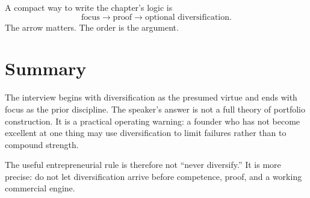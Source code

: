 A compact way to write the chapter's logic is
\begin{equation}
\text{focus}
\longrightarrow
\text{proof}
\longrightarrow
\text{optional diversification}.
\end{equation}
The arrow matters. The order is the argument.

\section{Summary}

The interview begins with diversification as the presumed virtue and ends with focus as the prior discipline. The speaker's answer is not a full theory of portfolio construction. It is a practical operating warning: a founder who has not become excellent at one thing may use diversification to limit failures rather than to compound strength.

The useful entrepreneurial rule is therefore not ``never diversify.'' It is more precise: do not let diversification arrive before competence, proof, and a working commercial engine.